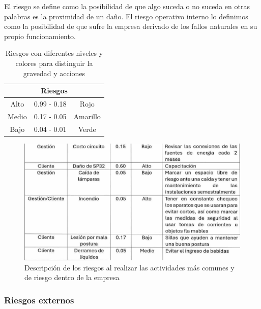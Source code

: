     El riesgo se define como la posibilidad de que algo suceda o no suceda en otras palabras es la proximidad de un daño. 
    El riesgo operativo interno lo definimos como la posibilidad de que sufre la empresa derivado de los fallos naturales en su propio funcionamiento.
    \begin{table}[h]
        \centering
        \caption{Riesgos con diferentes niveles y colores para distinguir la gravedad y acciones}
        \begin{tabular}{|c| c| c|}
        \hline
        \multicolumn{3}{|c|}{Riesgos}\\
        \hline
             Alto& 0.99 - 0.18 & Rojo  \\
        \hline     
             Medio& 0.17 - 0.05 & Amarillo \\
        \hline
             Bajo& 0.04 - 0.01 & Verde \\
        \hline
        \end{tabular}
        \label{tab:Riesgos}
    \end{table}
    \begin{figure}[H]
        \centering
        \includegraphics[trim = {1mm 1mm 1mm 1mm},clip,scale=0.3]{8/Img/Riesgos0.pdf}
        \caption{Descripción de los riesgos al realizar las actividades más comunes y de riesgo dentro de la empresa}
        \label{Riesgos internos}
    \end{figure}
    \subsubsection{Riesgos externos}
    
